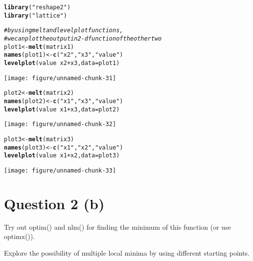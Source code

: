 \documentclass[english]{article}\usepackage[]{graphicx}\usepackage[]{color}
\makeatletter
\def\maxwidth{ %
  \ifdim\Gin@nat@width>\linewidth
    \linewidth
  \else
    \Gin@nat@width
  \fi
}
\newcommand{\hlstr}[1]{\textcolor[rgb]{0.192,0.494,0.8}{#1}}%
\newcommand{\hlcom}[1]{\textcolor[rgb]{0.678,0.584,0.686}{\textit{#1}}}%
\newcommand{\hlopt}[1]{\textcolor[rgb]{0,0,0}{#1}}%
\newcommand{\hlstd}[1]{\textcolor[rgb]{0.345,0.345,0.345}{#1}}%
\newcommand{\hlkwb}[1]{\textcolor[rgb]{0.69,0.353,0.396}{#1}}%
\newcommand{\hlkwc}[1]{\textcolor[rgb]{0.333,0.667,0.333}{#1}}%
\newcommand{\hlkwd}[1]{\textcolor[rgb]{0.737,0.353,0.396}{\textbf{#1}}}%
\newenvironment{kframe}{%
 \def\at@end@of@kframe{}%
 \ifinner\ifhmode%
  \def\at@end@of@kframe{\end{minipage}}%
  \begin{minipage}{\columnwidth}%
 \fi\fi%
 \def\FrameCommand##1{\hskip\@totalleftmargin \hskip-\fboxsep
 \colorbox{shadecolor}{##1}\hskip-\fboxsep
     \hskip-\linewidth \hskip-\@totalleftmargin \hskip\columnwidth}%
 \MakeFramed {\advance\hsize-\width
   \@totalleftmargin\z@ \linewidth\hsize
   \@setminipage}}%
 {\par\unskip\endMakeFramed%
 \at@end@of@kframe}
\newenvironment{knitrout}{}{} %
\makeatother
\begin{document}
\begin{knitrout}
\begin{kframe}
\begin{alltt}
\hlkwd{library}\hlstd{(}\hlstr{"reshape2"}\hlstd{)}
\hlkwd{library}\hlstd{(}\hlstr{"lattice"}\hlstd{)}

\hlcom{# by using melt and levelplot functions,  }
\hlcom{# we can plot the output in 2-d function of the other two }
\hlstd{plot1} \hlkwb{<-} \hlkwd{melt}\hlstd{(matrix1)}
\hlkwd{names}\hlstd{(plot1)} \hlkwb{<-} \hlkwd{c}\hlstd{(}\hlstr{"x2"}\hlstd{,} \hlstr{"x3"}\hlstd{,} \hlstr{"value"}\hlstd{)}
\hlkwd{levelplot}\hlstd{(value} \hlopt{~} \hlstd{x2} \hlopt{+} \hlstd{x3,} \hlkwc{data}\hlstd{=plot1)}
\end{alltt}
\end{kframe}
\texttt{[image: figure/unnamed-chunk-31]} 
\begin{kframe}\begin{alltt}
\hlstd{plot2} \hlkwb{<-} \hlkwd{melt}\hlstd{(matrix2)}
\hlkwd{names}\hlstd{(plot2)} \hlkwb{<-} \hlkwd{c}\hlstd{(}\hlstr{"x1"}\hlstd{,} \hlstr{"x3"}\hlstd{,} \hlstr{"value"}\hlstd{)}
\hlkwd{levelplot}\hlstd{(value} \hlopt{~} \hlstd{x1} \hlopt{+} \hlstd{x3,} \hlkwc{data}\hlstd{=plot2)}
\end{alltt}
\end{kframe}
\texttt{[image: figure/unnamed-chunk-32]} 
\begin{kframe}\begin{alltt}
\hlstd{plot3} \hlkwb{<-} \hlkwd{melt}\hlstd{(matrix3)}
\hlkwd{names}\hlstd{(plot3)} \hlkwb{<-} \hlkwd{c}\hlstd{(}\hlstr{"x1"}\hlstd{,} \hlstr{"x2"}\hlstd{,} \hlstr{"value"}\hlstd{)}
\hlkwd{levelplot}\hlstd{(value} \hlopt{~} \hlstd{x1} \hlopt{+} \hlstd{x2,} \hlkwc{data}\hlstd{=plot3)}
\end{alltt}
\end{kframe}
\texttt{[image: figure/unnamed-chunk-33]} 

\end{knitrout}


\section*{Question 2 (b)}

Try out optim() and nlm() for finding the minimum of this function
(or use optimx()).  

Explore the possibility of multiple local minima by using different
starting points.
\end{document}
